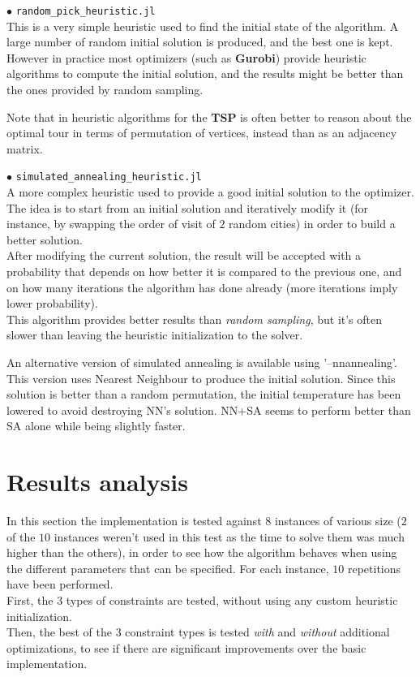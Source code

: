 \documentclass[
12pt,
a4paper,
oneside,
headinclude,
footinclude]{article}
\begin{document}
    $\bullet$ \texttt{random\_pick\_heuristic.jl}\\
    This is a very simple heuristic used to find the initial state of the algorithm. A large number of random initial solution is produced, and the best one is kept.\\
    However in practice most optimizers (such as \textbf{Gurobi}) provide heuristic algorithms to compute the initial solution, and the results might be better than the ones provided by random sampling.
    
    Note that in heuristic algorithms for the \textbf{TSP} is often better to reason about the optimal tour in terms of permutation of vertices, instead than as an adjacency matrix.
    
    
    $\bullet$ \texttt{simulated\_annealing\_heuristic.jl}\\
    A more complex heuristic used to provide a good initial solution to the optimizer.\\
    The idea is to start from an initial solution and iteratively modify it (for instance, by swapping the order of visit of $2$ random cities) in order to build a better solution.\\
    After modifying the current solution, the result will be accepted with a probability that depends on how better it is compared to the previous one, and on how many iterations the algorithm has done already (more iterations imply lower probability).\\
    This algorithm provides better results than \textit{random sampling}, but it's often slower than leaving the heuristic initialization to the solver.

    An alternative version of simulated annealing is available using '--nnannealing'. This version uses Nearest Neighbour to produce the initial solution. Since this solution is better than a random permutation, the initial temperature has been lowered to avoid destroying NN's solution. NN+SA seems to perform better than SA alone while being slightly faster.

    
    \newpage 
    \section{Results analysis}
    In this section the implementation is tested against $8$ instances of various size ($2$ of the $10$ instances weren't used in this test as the time to solve them was much higher than the others), in order to see how the algorithm behaves when using the different parameters that can be specified. For each instance, $10$ repetitions have been performed. \\
    First, the $3$ types of constraints are tested, without using any custom heuristic initialization. \\
    Then, the best of the $3$ constraint types is tested \textit{with} and \textit{without} additional optimizations, to see if there are significant improvements over the basic implementation.
    
\end{document}
